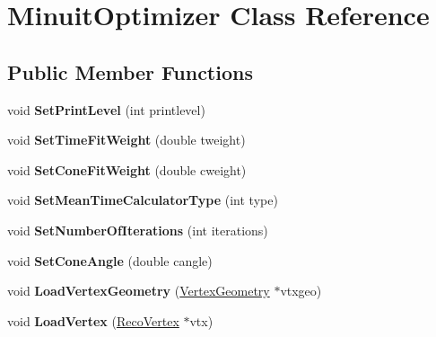 \hypertarget{classMinuitOptimizer}{\section{Minuit\-Optimizer Class Reference}
\label{classMinuitOptimizer}
}
\subsection*{Public Member Functions}
\begin{DoxyCompactItemize}
\item 
\hypertarget{classMinuitOptimizer_af957656cb1d0339c7cf0ad0199817786}{void {\bfseries Set\-Print\-Level} (int printlevel)}\label{classMinuitOptimizer_af957656cb1d0339c7cf0ad0199817786}

\item 
\hypertarget{classMinuitOptimizer_ab93bdadeff0f40951fc1ae38e637d1cd}{void {\bfseries Set\-Time\-Fit\-Weight} (double tweight)}\label{classMinuitOptimizer_ab93bdadeff0f40951fc1ae38e637d1cd}

\item 
\hypertarget{classMinuitOptimizer_ac386f4829b2838ecdf43f83071b9211d}{void {\bfseries Set\-Cone\-Fit\-Weight} (double cweight)}\label{classMinuitOptimizer_ac386f4829b2838ecdf43f83071b9211d}

\item 
\hypertarget{classMinuitOptimizer_abee6c05c3be56f9f91e5a2bf5425c6f9}{void {\bfseries Set\-Mean\-Time\-Calculator\-Type} (int type)}\label{classMinuitOptimizer_abee6c05c3be56f9f91e5a2bf5425c6f9}

\item 
\hypertarget{classMinuitOptimizer_ad7a963c1aa7f84ba2312a432149dbf0e}{void {\bfseries Set\-Number\-Of\-Iterations} (int iterations)}\label{classMinuitOptimizer_ad7a963c1aa7f84ba2312a432149dbf0e}

\item 
\hypertarget{classMinuitOptimizer_ae30cc5de352fbd8df809926d56365bc8}{void {\bfseries Set\-Cone\-Angle} (double cangle)}\label{classMinuitOptimizer_ae30cc5de352fbd8df809926d56365bc8}

\item 
\hypertarget{classMinuitOptimizer_a9f48b624230650920feff32180370fa2}{void {\bfseries Load\-Vertex\-Geometry} (\hyperlink{classVertexGeometry}{Vertex\-Geometry} $\ast$vtxgeo)}\label{classMinuitOptimizer_a9f48b624230650920feff32180370fa2}

\item 
\hypertarget{classMinuitOptimizer_ab58594047959a1e05fdfd970667b1e04}{void {\bfseries Load\-Vertex} (\hyperlink{classRecoVertex}{Reco\-Vertex} $\ast$vtx)}\label{classMinuitOptimizer_ab58594047959a1e05fdfd970667b1e04}


\end{DoxyCompactItemize}
